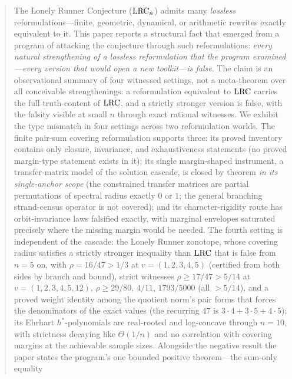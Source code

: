 
\begin{abstract}
\noindent
The Lonely Runner Conjecture ($\lrc_n$) admits many \emph{lossless}
reformulations---finite, geometric, dynamical, or arithmetic rewrites
exactly equivalent to it. This paper reports a structural fact that
emerged from a program of attacking the conjecture through such
reformulations: \emph{every natural strengthening of a lossless
reformulation that the program examined---every version that would open a
new toolkit---is false}. The claim is an observational summary of four
witnessed settings, not a meta-theorem over all conceivable
strengthenings: a reformulation equivalent to $\lrc$ carries the full
truth-content of $\lrc$, and a strictly stronger version is false, with
the falsity visible at small $n$ through exact rational witnesses. We
exhibit the type mismatch in four settings across two reformulation
worlds. The finite pair-sum covering reformulation supports three: its
proved inventory contains only closure, invariance, and exhaustiveness
statements (no proved margin-type statement exists in it); its single
margin-shaped instrument, a transfer-matrix model of the solution
cascade, is closed by theorem \emph{in its single-anchor scope} (the
constrained transfer matrices are partial permutations of spectral radius
exactly $0$ or $1$; the general branching strand-census operator is not
covered); and its character-rigidity route has orbit-invariance laws
falsified exactly, with marginal envelopes saturated precisely where the
missing margin would be needed. The fourth setting is independent of the
cascade: the Lonely Runner zonotope, whose covering radius satisfies a
strictly stronger inequality than $\lrc$ that is false from $n=5$ on,
with $\rho=16/47>1/3$ at $v=(1,2,3,4,5)$ (certified from both sides by
branch and bound), strict witnesses $\rho\ge17/47>5/14$ at
$v=(1,2,3,4,5,12)$, $\rho\ge29/80$, $4/11$, $1793/5000$ (all $>5/14$),
and a proved weight identity among the quotient norm's pair forms that
forces the denominators of the exact values (the recurring $47$ is
$3\cdot4+3\cdot5+4\cdot5$); its Ehrhart $h^*$-polynomials are
real-rooted and log-concave through $n=10$, with strictness decaying
like $\Theta(1/n)$ and no correlation with covering margins at the
achievable sample sizes. Alongside the negative result the paper states
the program's one bounded positive theorem---the sum-only equality

\end{abstract}
